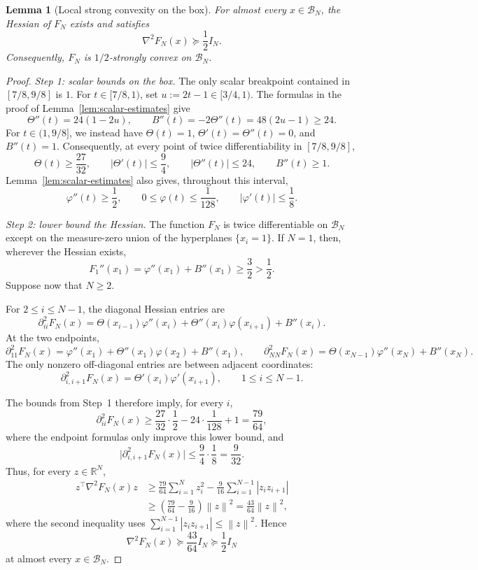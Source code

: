 \documentclass[11pt]{article}
\newtheorem{lemma}[theorem]{Lemma}
\newcommand{\R}{\mathbb{R}}
\newcommand{\norm}[1]{\left\lVert #1\right\rVert}
\begin{document}
\begin{lemma}[Local strong convexity on the box]
\label{lem:box-strong}
For almost every $x\in \mathcal B_N$, the Hessian of $F_N$ exists and satisfies
\[
\nabla^2 F_N(x)\succeq \frac12 I_N.
\]
Consequently, $F_N$ is $1/2$-strongly convex on $\mathcal B_N$.
\end{lemma}
\begin{proof}
\emph{Step 1: scalar bounds on the box.}
The only scalar breakpoint contained in \([7/8,9/8]\) is \(1\). For \(t\in[7/8,1)\), set
\(u:=2t-1\in[3/4,1)\). The formulas in the proof of Lemma~\ref{lem:scalar-estimates} give
\[
\Theta''(t)=24(1-2u),
\qquad
B''(t)=-2\Theta''(t)=48(2u-1)\ge24.
\]
For \(t\in(1,9/8]\), we instead have
\(\Theta(t)=1\), \(\Theta'(t)=\Theta''(t)=0\), and \(B''(t)=1\). Consequently, at every point of twice
differentiability in \([7/8,9/8]\),
\[
\Theta(t)\ge\frac{27}{32},
\qquad
|\Theta'(t)|\le\frac94,
\qquad
|\Theta''(t)|\le24,
\qquad
B''(t)\ge1.
\]
Lemma~\ref{lem:scalar-estimates} also gives, throughout this interval,
\[
\varphi''(t)\ge\frac12,
\qquad
0\le\varphi(t)\le\frac{1}{128},
\qquad
|\varphi'(t)|\le\frac18.
\]

\emph{Step 2: lower bound the Hessian.}
The function \(F_N\) is twice differentiable on \(\mathcal B_N\) except on the measure-zero union of the hyperplanes
\(\{x_i=1\}\). If \(N=1\), then, wherever the Hessian exists,
\[
F_1''(x_1)=\varphi''(x_1)+B''(x_1)\ge\frac32>\frac12.
\]
Suppose now that \(N\ge2\).

For \(2\le i\le N-1\), the diagonal Hessian entries are
\[
\partial_{ii}^2F_N(x)
=
\Theta(x_{i-1})\varphi''(x_i)
+\Theta''(x_i)\varphi(x_{i+1})
+B''(x_i).
\]
At the two endpoints,
\[
\partial_{11}^2F_N(x)
=
\varphi''(x_1)+\Theta''(x_1)\varphi(x_2)+B''(x_1),
\qquad
\partial_{NN}^2F_N(x)
=
\Theta(x_{N-1})\varphi''(x_N)+B''(x_N).
\]
The only nonzero off-diagonal entries are between adjacent coordinates:
\[
\partial_{i,i+1}^2F_N(x)
=
\Theta'(x_i)\varphi'(x_{i+1}),
\qquad 1\le i\le N-1.
\]

The bounds from Step~1 therefore imply, for every \(i\),
\[
\partial_{ii}^2F_N(x)
\ge
\frac{27}{32}\cdot\frac12
-24\cdot\frac{1}{128}
+1
=\frac{79}{64},
\]
where the endpoint formulas only improve this lower bound, and
\[
\bigl|\partial_{i,i+1}^2F_N(x)\bigr|
\le
\frac94\cdot\frac18
=\frac{9}{32}.
\]
Thus, for every \(z\in\R^N\),
\begin{align*}
z^\top\nabla^2F_N(x)z
&\ge
\frac{79}{64}\sum_{i=1}^N z_i^2
-\frac{9}{16}\sum_{i=1}^{N-1}|z_i z_{i+1}|\\
&\ge
\left(\frac{79}{64}-\frac{9}{16}\right)\norm{z}^2
=
\frac{43}{64}\norm{z}^2,
\end{align*}
where the second inequality uses
\(\sum_{i=1}^{N-1}|z_i z_{i+1}|\le\norm{z}^2\).
Hence
\[
\nabla^2F_N(x)\succeq\frac{43}{64}I_N\succeq\frac12 I_N
\]
at almost every \(x\in\mathcal B_N\).


\end{proof}
\end{document}
